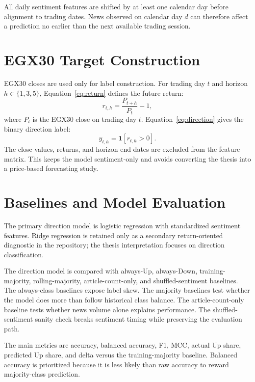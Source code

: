 All daily sentiment features are shifted by at least one calendar day before alignment to trading dates. News observed on calendar day $d$ can therefore affect a prediction no earlier than the next available trading session.

\section{EGX30 Target Construction}

EGX30 closes are used only for label construction. For trading day $t$ and horizon $h \in \{1,3,5\}$, Equation~\ref{eq:return} defines the future return:
\begin{equation}
r_{t,h} = \frac{P_{t+h}}{P_t} - 1,
\label{eq:return}
\end{equation}
where $P_t$ is the EGX30 close on trading day $t$. Equation~\ref{eq:direction} gives the binary direction label:
\begin{equation}
y_{t,h} = \mathbf{1}[r_{t,h} > 0].
\label{eq:direction}
\end{equation}
The close values, returns, and horizon-end dates are excluded from the feature matrix. This keeps the model sentiment-only and avoids converting the thesis into a price-based forecasting study.

\section{Baselines and Model Evaluation}

The primary direction model is logistic regression with standardized sentiment features. Ridge regression is retained only as a secondary return-oriented diagnostic in the repository; the thesis interpretation focuses on direction classification.

The direction model is compared with always-Up, always-Down, training-majority, rolling-majority, article-count-only, and shuffled-sentiment baselines. The always-class baselines expose label skew. The majority baselines test whether the model does more than follow historical class balance. The article-count-only baseline tests whether news volume alone explains performance. The shuffled-sentiment sanity check breaks sentiment timing while preserving the evaluation path.

The main metrics are accuracy, balanced accuracy, F1, MCC, actual Up share, predicted Up share, and delta versus the training-majority baseline. Balanced accuracy is prioritized because it is less likely than raw accuracy to reward majority-class prediction.

